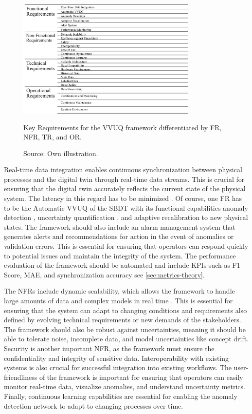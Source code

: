 \begin{figure}[htbp]
  \centering
  \includegraphics[width=0.8\textwidth]{figures/req.png}
  \caption[Key requirements for VVUQ]{Key Requirements for the VVUQ framework differentiated by FR, NFR, TR, and OR. }
  \caption*{Source: Own illustration.}
  \label{fig:requirements}
\end{figure}

Real-time data integration enables continuous synchronization between physical processes and the digital twin through real-time data streams. This is crucial for ensuring that the digital twin accurately reflects the current state of the physical system. The latency in this regard has to be minimized \autocite{li2018learning}. Of course, one FR has to be the Automatic VVUQ of the SBDT with its functional capabilities anomaly detection \autocite{pang2021deep}, uncertainty quantification \autocite{sel2025survey}, and adaptive recalibration to new physical states. The framework should also include an alarm management system that generates alerts and recommendations for action in the event of anomalies or validation errors. This is essential for ensuring that operators can respond quickly to potential issues and maintain the integrity of the system. The performance evaluation of the framework should be automated and include KPIs such as F1-Score, MAE, and synchronization accuracy see \autoref{sec:metrics-theory}.

The NFRs include dynamic scalability, which allows the framework to handle large amounts of data and complex models in real time \autocite{leskovec2020mining}. This is essential for ensuring that the system can adapt to changing conditions and requirements also defined by evolving technical requirements or new demands of the stakeholders. The framework should also be robust against uncertainties, meaning it should be able to tolerate noise, incomplete data, and model uncertainties like concept drift. Security is another important NFR, as the framework must ensure the confidentiality and integrity of sensitive data. Interoperability with existing systems is also crucial for successful integration into existing workflows. The user-friendliness of the framework is important for ensuring that operators can easily monitor real-time data, visualize anomalies, and understand uncertainty metrics. Finally, continuous learning capabilities are essential for enabling the anomaly detection network to adapt to changing processes over time.

